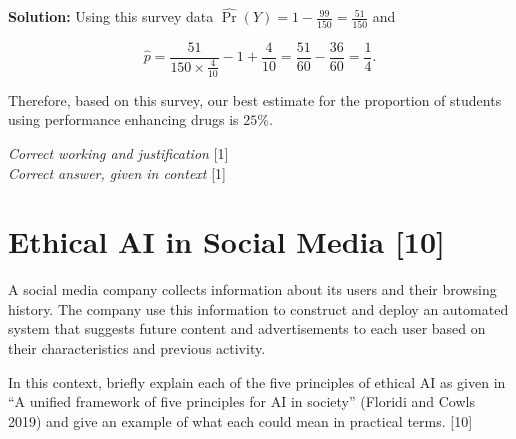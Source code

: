 \documentclass[a4paper, 11pt]{article}
\begin{document}
{\color{blue}
\textbf{Solution:}
%
Using this survey data $\hat \Pr(Y) = 1 - \frac{99}{150} = \frac{51}{150}$ and

$$ \hat p = \frac{51}{150 \times \frac{4}{10}} - 1 + \frac{4}{10} = \frac{51}{60} - \frac{36}{60} = \frac{1}{4} . $$

Therefore, based on this survey, our best estimate for the proportion of students using performance enhancing drugs is $25\%$. 

\textit{Correct working and justification} [1]  \\
\textit{Correct answer, given in context} [1]
}

\section{Ethical AI in Social Media [10] }

A social media company collects information about its users and their browsing history. The company use this information to construct and deploy an automated system that suggests future content and advertisements to each user based on their characteristics and previous activity.  

In this context, briefly explain each of the five principles of ethical AI as given in ``A unified framework of five principles for AI in society'' (Floridi and Cowls 2019)  and give an example of what each could mean in practical terms. [10] 
\end{document}
